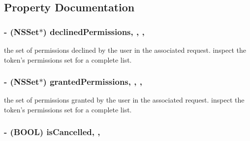 \subsection{Property Documentation}
\hypertarget{interface_f_b_s_d_k_login_manager_login_result_ae64209439a8f3d962ce548d9581af510}{
\subsubsection[{declined\-Permissions}]{\setlength{\rightskip}{0pt plus 5cm}-\/ (N\-S\-Set$\ast$) declined\-Permissions\hspace{0.3cm}{\ttfamily [read]}, {\ttfamily [write]}, {\ttfamily [nonatomic]}, {\ttfamily [copy]}}}\label{interface_f_b_s_d_k_login_manager_login_result_ae64209439a8f3d962ce548d9581af510}
the set of permissions declined by the user in the associated request.  inspect the token's permissions set for a complete list. \hypertarget{interface_f_b_s_d_k_login_manager_login_result_ae9fe0eaba0b1fddcf8c681c0a1f85e53}{
\subsubsection[{granted\-Permissions}]{\setlength{\rightskip}{0pt plus 5cm}-\/ (N\-S\-Set$\ast$) granted\-Permissions\hspace{0.3cm}{\ttfamily [read]}, {\ttfamily [write]}, {\ttfamily [nonatomic]}, {\ttfamily [copy]}}}\label{interface_f_b_s_d_k_login_manager_login_result_ae9fe0eaba0b1fddcf8c681c0a1f85e53}
the set of permissions granted by the user in the associated request.  inspect the token's permissions set for a complete list. \hypertarget{interface_f_b_s_d_k_login_manager_login_result_a95ae85cb68f693c343232670c3d1ae64}{
\subsubsection[{is\-Cancelled}]{\setlength{\rightskip}{0pt plus 5cm}-\/ (B\-O\-O\-L) is\-Cancelled\hspace{0.3cm}{\ttfamily [read]}, {\ttfamily [nonatomic]}, {\ttfamily [assign]}}}\label{interface_f_b_s_d_k_login_manager_login_result_a95ae85cb68f693c343232670c3d1ae64}
